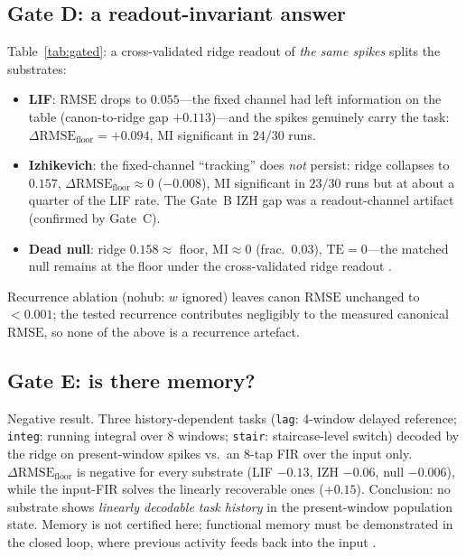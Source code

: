 \documentclass[10pt,a4paper]{article}
\newcommand{\RMSE}{\ensuremath{\mathrm{RMSE}}}
\newcommand{\MI}{\ensuremath{\mathrm{MI}}}
\newcommand{\TE}{\ensuremath{\mathrm{TE}}}
\newcommand{\dfloor}{\ensuremath{\Delta\RMSE_{\mathrm{floor}}}}
\begin{document}
\subsection{Gate D: a readout-invariant answer}\label{sec:gatedres}
\begin{table}[H]
\centering
\caption{Gate D: same spikes, decoder sweep (pooled 5 profiles
$\times$ 6 seeds). $\dfloor=$ $\RMSE_{\mathrm{meanpd}}-
\RMSE_{\mathrm{decoder}}$ is the RMSE improvement over the
mean-predictor (no-information) floor; $\MI$ in nats;
$\MI_{\mathrm{sig}}$ is the fraction of runs with significant $\MI$.}
\label{tab:gated}

\end{table}
Table~\ref{tab:gated}: a cross-validated ridge readout of
\emph{the same spikes} splits the substrates:
\begin{itemize}[nosep]
\item \textbf{LIF}: $\RMSE$ drops to $0.055$---the fixed channel had
left information on the table (canon-to-ridge gap $+0.113$)---and the
spikes genuinely carry the task: $\dfloor=+0.094$, $\MI$ significant in
$24/30$ runs.
\item \textbf{Izhikevich}: the fixed-channel ``tracking'' does
\emph{not} persist: ridge collapses to $0.157$, $\dfloor\approx0$
($-0.008$), $\MI$ significant in $23/30$ runs but at about a quarter
of the LIF rate. The Gate~B IZH gap was a readout-channel artifact
(confirmed by Gate~C).
\item \textbf{Dead null}: ridge $0.158\approx$ floor, $\MI\approx0$
(frac.\ $0.03$), $\TE=0$---the matched null remains at the floor under
the cross-validated ridge readout \cite{hoerl1970,paninski2004}.
\end{itemize}
Recurrence ablation (nohub: $w$ ignored) leaves canon $\RMSE$ unchanged
to $<0.001$; the tested recurrence contributes negligibly to the
measured canonical $\RMSE$, so none of the above is a recurrence
artefact.

\subsection{Gate E: is there memory?}\label{sec:gateeres}
\begin{table}[H]
\centering
\caption{Gate E: RMSE improvement over the mean-predictor floor,
$\dfloor$\ (ridge minus floor), per profile, plus the input-only
8-tap FIR reference (positive \emph{floor} values).}
\label{tab:gatee}

\end{table}
Negative result. Three history-dependent tasks (\texttt{lag}:
4-window delayed reference; \texttt{integ}: running integral over
$8$ windows; \texttt{stair}: staircase-level switch) decoded by the
ridge on present-window spikes vs.\ an $8$-tap FIR over the input only.
$\dfloor$ is negative for every substrate
(LIF $-0.13$, IZH $-0.06$, null $-0.006$), while the input-FIR solves
the linearly recoverable ones ($+0.15$). Conclusion: no substrate shows
\emph{linearly decodable task history} in the present-window population
state. Memory is not certified here; functional memory must be
demonstrated in the closed loop, where previous activity feeds back
into the input \cite{carmena2003,nicolelis2003}.
\end{document}
